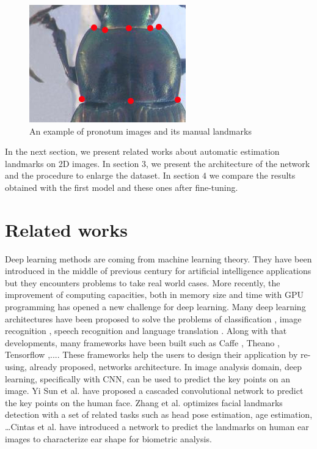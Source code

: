 \documentclass[10pt]{article}
\begin{document}
\begin{figure}[htbp]
\centering
	\centerline{\includegraphics[scale=0.7]{images/pronotum}}
	\caption{\small{An example of pronotum images and its manual landmarks}}
	\label{figpronotum}
\end{figure}

In the next section, we present related works about automatic
estimation landmarks on 2D images. In section $3$, we present the
architecture of the network and the procedure to enlarge the dataset. In section $4$ we compare the results obtained with the first
model and these ones after fine-tuning. 


\section{Related works}
Deep learning methods are coming from machine learning theory. They
have been introduced in the middle of previous century for artificial
intelligence applications but they encounters problems to
take real world cases. More recently, the improvement of computing capacities, both in
memory size and time with GPU programming has opened a new challenge  
for deep learning. Many deep learning architectures have been proposed
to solve the problems of classification \cite{krizhevsky2012imagenet,
  ciregan2012multi}, image recognition \cite{szegedy2015going,
  farabet2013learning, li2015convolutional}, speech recognition
\cite{mikolov2011strategies, hinton2012deep} and language translation
\cite{jean2014using, sutskever2014sequence}. Along with that
developments, many frameworks have been built such as Caffe
\cite{jia2014caffe}, Theano \cite{2016arXiv160502688short}, Tensorflow
\cite{tensorflow2015},.... These frameworks help
the users to design their application by re-using, already proposed, networks
architecture. In image analysis domain,
deep learning, specifically with CNN, can be used to predict the key points on
an image. Yi Sun et al. \cite{sun2013deep} have proposed a cascaded
convolutional network to predict the key points on the human
face. Zhang et al. \cite{zhang2014facial} optimizes facial landmarks
detection with a set of related tasks such as head pose estimation,
age estimation, \ldots Cintas et al. \cite{cintas2016automatic} have
introduced a network to predict the landmarks on human ear images to
characterize ear shape for biometric analysis.
\end{document}
